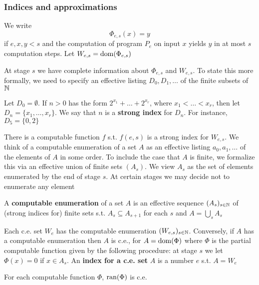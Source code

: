 \documentclass[11pt]{article}
\begin{document}
\subsubsection{Indices and approximations}
\label{sec:org7762b60}
\begin{definition}[]
We write
\begin{equation*}
\Phi_{e,s}(x)=y
\end{equation*}
if \(e,x,y<s\) and the computation of program \(P_e\) on input \(x\) yields \(y\) in at
most \(s\) computation steps. Let \(W_{e,s}=\operatorname{dom}(\Phi_{e,s})\)
\end{definition}

At stage \(s\) we have complete information about \(\Phi_{e,s}\) and \(W_{e,s}\). To state this
more formally, we need to specify an effective listing \(D_0,D_1,\dots\) of the finite subsets of \(\mathbb{N}\)

\begin{definition}[]
Let \(D_0=\emptyset\). If \(n>0\) has the form \(2^{x_1}+\dots+2^{x_r}\), where \(x_1<\dots<x_r\), then
let \(D_n=\{x_1,\dots,x_r\}\). We say that \(n\) is a \textbf{strong index} for \(D_n\). For instance, \(D_5=\{0,2\}\)
\end{definition}

There is a computable function \(f\) s.t. \(f(e,s)\) is a strong index for \(W_{e,s}\). We think
of a computable enumeration of a set \(A\) as an effective listing \(a_0,a_1,\dots\) of the elements
of \(A\) in some order. To include the case that \(A\) is finite, we formalize this via an
effective union of finite sets \((A_s)\). We view \(A_s\) as the set of elements enumerated by
the end of stage \(s\). At certain stages we may decide not to enumerate any element

\begin{definition}[]
A \textbf{computable enumeration} of a set \(A\) is an effective sequence \((A_s)_{s\in\mathbb{N}}\) of (strong
indices for) finite sets s.t. \(A_s\subseteq A_{s+1}\) for each \(s\) and \(A=\bigcup_sA_s\)
\end{definition}

Each c.e. set \(W_e\) has the computable enumeration \((W_{e,s})_{s\in\mathbb{N}}\). Conversely, if \(A\)
has a computable enumeration then \(A\) is c.e., for \(A=\operatorname{dom}(\Phi)\) where \(\Phi\) is the partial
computable function given by the following procedure: at stage \(s\) we let \(\Phi(x)=0\)
if \(x\in A_s\). An \textbf{index for a c.e. set} \(A\) is a number \(e\) s.t. \(A=W_e\)

\begin{proposition}[]
For each computable function \(\Phi\), \(\operatorname{ran}(\Phi)\) is c.e.
\end{proposition}
\end{document}
